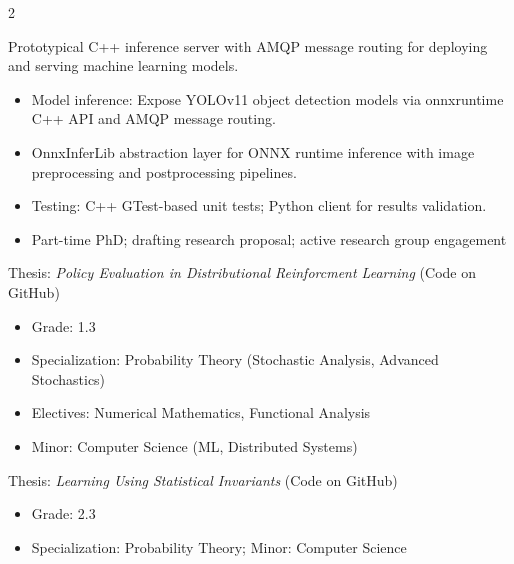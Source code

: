 \documentclass[10pt,a4paper,ragged2e,withhyper]{altacv}
\begin{document}
\begin{paracol}{2}
\par\divider


Prototypical C++ inference server with AMQP message routing for deploying and serving machine learning models.

\begin{itemize}
\item Model inference: Expose YOLOv11 object detection models via onnxruntime C++ API and AMQP message routing.
\item OnnxInferLib abstraction layer for ONNX runtime inference with image preprocessing and postprocessing pipelines.
\item Testing: C++ GTest-based unit tests; Python client for results validation.
\end{itemize}

\bigskip
\switchcolumn
{}
\label{sec:orgf6576be}
\begin{itemize}
\item Part-time PhD; drafting research proposal; active research group engagement
\end{itemize}

\divider

Thesis: \textit{Policy Evaluation in Distributional Reinforcment Learning} (Code on GitHub)
\begin{itemize}
\item Grade: 1.3
\item Specialization: Probability Theory (Stochastic Analysis, Advanced Stochastics)
\item Electives: Numerical Mathematics, Functional Analysis
\item Minor: Computer Science (ML, Distributed Systems)
\end{itemize}
\divider

Thesis: \textit{Learning Using Statistical Invariants} (Code on GitHub)
\begin{itemize}
\item Grade: 2.3
\item Specialization: Probability Theory; Minor: Computer Science
\end{itemize}
\divider


\end{paracol}
\end{document}

